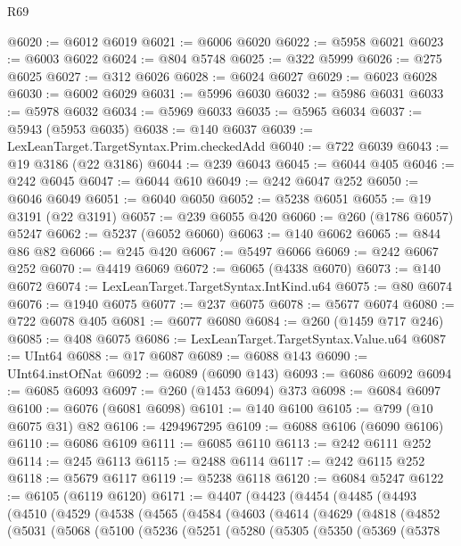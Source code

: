 \begin{lexlean}{R69}
\begin{coremodule}
{@6020 := @6012 @6019
@6021 := @6006 @6020
@6022 := @5958 @6021
@6023 := @6003 @6022
@6024 := @804 @5748
@6025 := @322 @5999
@6026 := @275 @6025
@6027 := @312 @6026
@6028 := @6024 @6027
@6029 := @6023 @6028
@6030 := @6002 @6029
@6031 := @5996 @6030
@6032 := @5986 @6031
@6033 := @5978 @6032
@6034 := @5969 @6033
@6035 := @5965 @6034
@6037 := @5943 (@5953 @6035)
@6038 := @140 @6037
@6039 := LexLeanTarget.TargetSyntax.Prim.checkedAdd
@6040 := @722 @6039
@6043 := @19 @3186 (@22 @3186)
@6044 := @239 @6043
@6045 := @6044 @405
@6046 := @242 @6045
@6047 := @6044 @610
@6049 := @242 @6047 @252
@6050 := @6046 @6049
@6051 := @6040 @6050
@6052 := @5238 @6051
@6055 := @19 @3191 (@22 @3191)
@6057 := @239 @6055 @420
@6060 := @260 (@1786 @6057) @5247
@6062 := @5237 (@6052 @6060)
@6063 := @140 @6062
@6065 := @844 @86 @82
@6066 := @245 @420
@6067 := @5497 @6066
@6069 := @242 @6067 @252
@6070 := @4419 @6069
@6072 := @6065 (@4338 @6070)
@6073 := @140 @6072
@6074 := LexLeanTarget.TargetSyntax.IntKind.u64
@6075 := @80 @6074
@6076 := @1940 @6075
@6077 := @237 @6075
@6078 := @5677 @6074
@6080 := @722 @6078 @405
@6081 := @6077 @6080
@6084 := @260 (@1459 @717 @246)
@6085 := @408 @6075
@6086 := LexLeanTarget.TargetSyntax.Value.u64
@6087 := UInt64
@6088 := @17 @6087
@6089 := @6088 @143
@6090 := UInt64.instOfNat
@6092 := @6089 (@6090 @143)
@6093 := @6086 @6092
@6094 := @6085 @6093
@6097 := @260 (@1453 @6094) @373
@6098 := @6084 @6097
@6100 := @6076 (@6081 @6098)
@6101 := @140 @6100
@6105 := @799 (@10 @6075 @31) @82
@6106 := 4294967295
@6109 := @6088 @6106 (@6090 @6106)
@6110 := @6086 @6109
@6111 := @6085 @6110
@6113 := @242 @6111 @252
@6114 := @245 @6113
@6115 := @2488 @6114
@6117 := @242 @6115 @252
@6118 := @5679 @6117
@6119 := @5238 @6118
@6120 := @6084 @5247
@6122 := @6105 (@6119 @6120)
@6171 := @4407
    (@4423
      (@4454
        (@4485
          (@4493
            (@4510
              (@4529
                (@4538
                  (@4565
                    (@4584
                      (@4603
                        (@4614
                          (@4629
                            (@4818
                              (@4852
                                (@5031
                                  (@5068
                                    (@5100
                                      (@5236
                                        (@5251
                                          (@5280
                                            (@5305
                                              (@5350
                                                (@5369
                                                  (@5378
}
\end{coremodule}
\end{lexlean}
